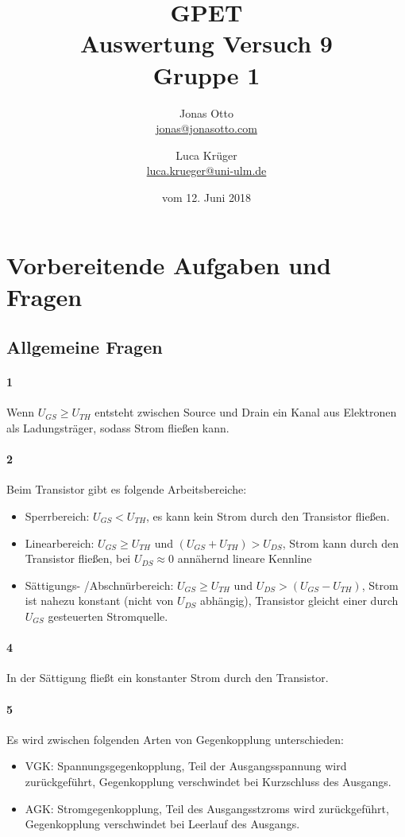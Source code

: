 \documentclass[a4paper]{article}
\title{GPET\\ Auswertung Versuch 9\\ Gruppe 1}
\author{Jonas Otto\\ \href{mailto:jonas@jonasotto.com}{jonas@jonasotto.com} 
   \and Luca Krüger \\ \href{mailto:luca.krueger@uni-ulm.de}{luca.krueger@uni-ulm.de} }
\date{vom 12. Juni 2018}
\newcommand{\ugs}{U_{GS}}
\newcommand{\uds}{U_{DS}}
\newcommand{\uth}{U_{TH}}
\begin{document}
\maketitle

\newpage

\section{Vorbereitende Aufgaben und Fragen}

\subsection{Allgemeine Fragen}
\paragraph{1}
Wenn $U_{GS} \geq U_{TH}$ entsteht zwischen Source und Drain ein Kanal aus Elektronen als Ladungsträger, sodass Strom fließen kann.

\paragraph{2}
Beim Transistor gibt es folgende Arbeitsbereiche:
\begin{itemize}
    \item Sperrbereich: $\ugs < U_{TH}$, es kann kein Strom durch den Transistor fließen.
    \item Linearbereich: $\ugs \geq \uth$ und $(\ugs + \uth) > \uds$, Strom kann durch den Transistor fließen, bei $\uds \approx 0$ annähernd lineare Kennline
    \item Sättigungs- /Abschnürbereich: $\ugs \geq \uth$ und $\uds > (\ugs - \uth)$, Strom ist nahezu konstant (nicht von $\uds$ abhängig), Transistor gleicht einer durch $\ugs$ gesteuerten Stromquelle.
\end{itemize}


\paragraph{4}
In der Sättigung fließt ein konstanter Strom durch den Transistor. 

\paragraph{5} Es wird zwischen folgenden Arten von Gegenkopplung unterschieden:

\begin{itemize}
    \item VGK: Spannungsgegenkopplung, Teil der Ausgangsspannung wird zurückgeführt, Gegenkopplung verschwindet bei Kurzschluss des Ausgangs.
    \item AGK: Stromgegenkopplung, Teil des Ausgangsstzroms wird zurückgeführt, Gegenkopplung verschwindet bei Leerlauf des Ausgangs. 
\end{itemize}
\end{document}
